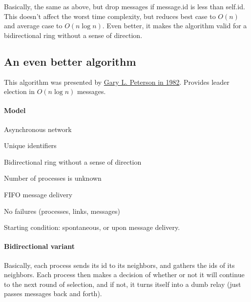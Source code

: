 \documentclass{idc_msc}
\begin{document}

Basically, the same as above, but drop messages if message.id is less than self.id.
This doesn't affect the worst time complexity, but reduces best case to $O(n)$ and average case to $O(n \log n)$.
Even better, it makes the algorithm valid for a bidirectional ring without a sense of direction.

\subsection{An even better algorithm}
This algorithm was presented by \href{http://dl.acm.org/citation.cfm?id=357194}{Gary L. Peterson in 1982}.
Provides leader election in $O(n \log n)$ messages.

\paragraph{Model}

\begin{itemize*}
  \item Asynchronous network
  \item Unique identifiers
  \item Bidirectional ring without a sense of direction
  \item Number of processes is unknown
  \item FIFO message delivery
  \item No failures (processes, links, messages)
  \item Starting condition: spontaneous, or upon message delivery.
\end{itemize*}

\paragraph{Bidirectional variant}


Basically, each process sends its id to its neighbors, and gathers the ids of its neighbors.
Each process then makes a decision of whether or not it will continue to the next round of selection, and if not, it turns itself into a dumb relay (just passes messages back and forth).
\end{document}
